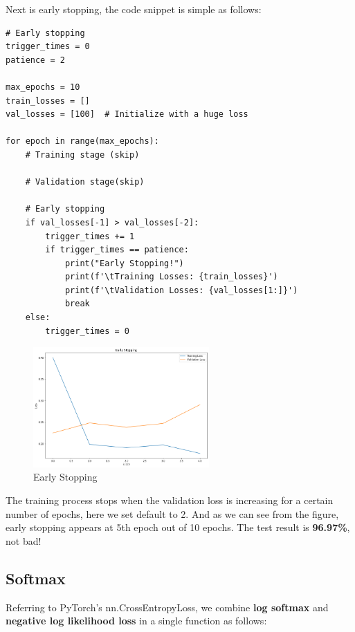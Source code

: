 \documentclass[a4paper, 11pt]{article} %
\begin{document}
Next is early stopping, the code snippet is simple as follows:

\begin{lstlisting}
# Early stopping
trigger_times = 0
patience = 2

max_epochs = 10
train_losses = []
val_losses = [100]  # Initialize with a huge loss

for epoch in range(max_epochs):
	# Training stage (skip)

	# Validation stage(skip)

	# Early stopping
	if val_losses[-1] > val_losses[-2]:
        trigger_times += 1
        if trigger_times == patience:
            print("Early Stopping!")
            print(f'\tTraining Losses: {train_losses}')
            print(f'\tValidation Losses: {val_losses[1:]}')
            break
    else:
        trigger_times = 0
\end{lstlisting}

\begin{figure}[H]
    \centering
    \includegraphics[width=0.6\textwidth]{./img/early-stopping.png}
    \caption{Early Stopping}
\end{figure}

The training process stops when the validation loss is increasing for a certain number of
epochs, here we set default to 2. And as we can see from the figure, early stopping appears
at 5th epoch out of 10 epochs. The test result is \textbf{96.97\%}, not bad!

\subsection{\textbf{Softmax}}

Referring to PyTorch's nn.CrossEntropyLoss, we combine \textbf{log softmax} and
\textbf{negative log likelihood loss} in a single function as follows:
\end{document}
